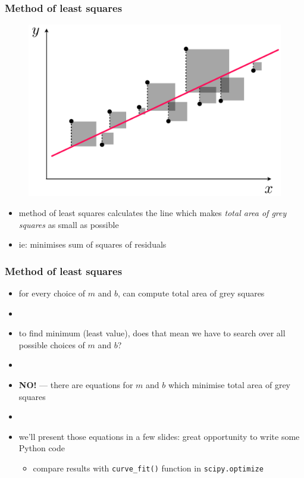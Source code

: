 \documentclass[english,14pt]{beamer}
\newcommand\red[1]{{\color{red} #1}}
\begin{document}
\begin{frame}[fragile]

\frametitle{Method of least squares}


\vspace*{-3mm}
\begin{figure}[ht]
	\centering
	\includegraphics[width=.7\textwidth]{figures/leastsquares}
\end{figure}
\vspace*{-3mm}
\begin{itemize}
	\item method of \red{least squares} calculates the line which makes \emph{total area of grey squares} as small as possible
	\item ie: minimises sum of squares of residuals
\end{itemize}

\end{frame}


\begin{frame}[fragile]

\frametitle{Method of least squares}

\begin{itemize}
	\item for every choice of $m$ and $b$, can compute total area of grey squares
	\item[]
	\item to find minimum (least value), does that mean we have to search over all possible choices of $m$ and $b$?
	\item[]
	\item \textbf{NO!} --- there are equations for $m$ and $b$ which minimise total area of grey squares
	\item[]
	\item we'll present those equations in a few slides: great opportunity to write some Python code
	\begin{itemize}
		\item compare results with \texttt{curve\_fit()} function in \texttt{scipy.optimize}
	\end{itemize}
\end{itemize}

\end{frame}
\end{document}
